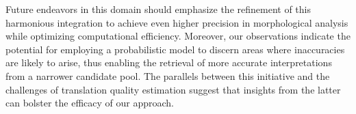 \documentclass[AMS,STIX2COL]{WileyNJD-v2}
\begin{document}
    Future endeavors in this domain should emphasize the refinement of this harmonious integration to achieve even higher precision in morphological analysis while optimizing computational efficiency.
    Moreover, our observations indicate the potential for employing a probabilistic model to discern areas where inaccuracies are likely to arise, thus enabling the retrieval of more accurate interpretations from a narrower candidate pool.
    The parallels between this initiative and the challenges of translation quality estimation suggest that insights from the latter can bolster the efficacy of our approach.


    
\end{document}

